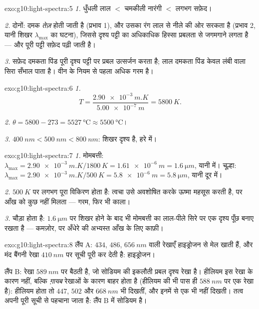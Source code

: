 \begin{solution}{exo:g10:light-spectra:5}
\emph{1.} धुँधली लाल $<$ चमकीली नारंगी $<$ लगभग सफ़ेद।

\emph{2.} दोनों: दमक \emph{तेज़} होती जाती है (प्रभाव 1), और उसका रंग
लाल से नीले की ओर सरकता है (प्रभाव 2, यानी शिखर $\lambda_{\max}$ का घटना), जिससे
दृश्य पट्टी का अधिकाधिक हिस्सा प्रबलता से जगमगाने लगता है --- और पूरी
पट्टी सफ़ेद पढ़ी जाती है।

\emph{3.} सफ़ेद दमकता पिंड पूरी दृश्य पट्टी पर प्रबल उत्सर्जन करता है;
लाल दमकता पिंड केवल लंबी  वाला सिरा सँभाल पाता है।
वीन के नियम से पहला अधिक गरम है।
\end{solution}

\begin{solution}{exo:g10:light-spectra:6}
\emph{1.}
\[
T = \frac{\qty{2.90e-3}{m.K}}{\qty{5.00e-7}{m}} = \qty{5800}{K}.
\]

\emph{2.} $\theta = 5800 - 273 = \qty{5527}{\degreeCelsius} \approx
\qty{5500}{\degreeCelsius}$।

\emph{3.} $\qty{400}{nm} < \qty{500}{nm} < \qty{800}{nm}$: शिखर दृश्य है, हरे में।
\end{solution}

\begin{solution}{exo:g10:light-spectra:7}
\emph{1.} मोमबत्ती: $\lambda_{\max} = \qty{2.90e-3}{m.K} / \qty{1800}{K} = \qty{1.61e-6}{m}
= \qty{1.6}{\micro m}$, यानी  में। चूल्हा: $\lambda_{\max} = \qty{2.90e-3}{m.K} / \qty{500}{K} = \qty{5.8e-6}{m}
= \qty{5.8}{\micro m}$,
यानी दूर  में।

\emph{2.} $\qty{500}{K}$ पर लगभग पूरा विकिरण  होता है: त्वचा उसे
अवशोषित करके ऊष्मा महसूस करती है, पर आँख को कुछ नहीं मिलता --- गरम,
फिर भी काला।

\emph{3.}  चौड़ा होता है: $\qty{1.6}{\micro m}$ पर शिखर होने के
बाद भी मोमबत्ती का  लाल-पीले सिरे पर एक दृश्य पूँछ बनाए
रखता है --- कमज़ोर, पर अँधेरे की अभ्यस्त आँख के लिए काफ़ी।
\end{solution}

\begin{solution}{exo:g10:light-spectra:8}
लैंप A: $434$, $486$, $\qty{656}{nm}$ वाली रेखाएँ हाइड्रोजन से मेल खाती हैं,
और मंद बैंगनी रेखा $\qty{410}{nm}$ पर सूची पूरी कर देती है: हाइड्रोजन।

लैंप B: रेखा $\qty{589}{nm}$ पर बैठती है, जो सोडियम की इकलौती प्रबल दृश्य रेखा
है। हीलियम इस रेखा के कारण नहीं, बल्कि \emph{ग़ायब} रेखाओं के कारण
बाहर होता है (हीलियम की भी पास ही $\qty{588}{nm}$ पर एक रेखा है): हीलियम होता
तो $447$, $502$ और $\qty{668}{nm}$ भी दिखतीं, और इनमें से एक भी नहीं दिखती।
तत्व अपनी पूरी सूची से पहचाना जाता है: लैंप B में सोडियम है।
\end{solution}


